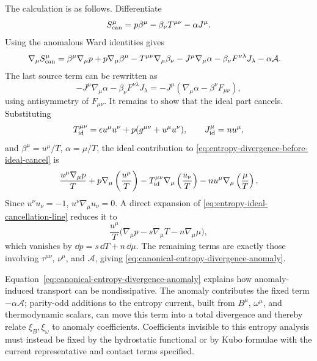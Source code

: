 The calculation is as follows.
Differentiate
\[
  S^\mu_{\rm can}=p\beta^\mu-\beta_\nu T^{\mu\nu}-\alpha J^\mu .
\]
Using the anomalous Ward identities gives
\begin{equation}
\begin{aligned}
  \nabla_\mu S^\mu_{\rm can}
  &=
  \beta^\mu\nabla_\mu p
  +p\nabla_\mu\beta^\mu
  -T^{\mu\nu}\nabla_\mu\beta_\nu
  -J^\mu\nabla_\mu\alpha
  -\beta_\nu F^{\nu\lambda}J_\lambda
  -\alpha\mathcal A .
\end{aligned}
  \label{eq:entropy-divergence-before-ideal-cancel}
\end{equation}
The last source term can be rewritten as
\begin{equation}
  -J^\mu\nabla_\mu\alpha-\beta_\nu F^{\nu\lambda}J_\lambda
  =
  -J^\mu\left(\nabla_\mu\alpha-\beta^\nu F_{\mu\nu}\right),
  \label{eq:entropy-force-combination}
\end{equation}
using antisymmetry of \(F_{\mu\nu}\).  It remains to show that the ideal
part cancels.  Substituting
\[
  T^{\mu\nu}_{\rm id}=\epsilon u^\mu u^\nu+p(g^{\mu\nu}+u^\mu u^\nu),
  \qquad J^\mu_{\rm id}=nu^\mu,
\]
and \(\beta^\mu=u^\mu/T\), \(\alpha=\mu/T\), the ideal contribution to
\eqref{eq:entropy-divergence-before-ideal-cancel} is
\begin{equation}
  \frac{u^\mu\nabla_\mu p}{T}
  +p\nabla_\mu\left(\frac{u^\mu}{T}\right)
  -T^{\mu\nu}_{\rm id}\nabla_\mu\left(\frac{u_\nu}{T}\right)
  -nu^\mu\nabla_\mu\left(\frac{\mu}{T}\right).
  \label{eq:entropy-ideal-cancellation-line}
\end{equation}
Since \(u^\nu u_\nu=-1\), \(u^\nu\nabla_\mu u_\nu=0\).  A direct expansion
of \eqref{eq:entropy-ideal-cancellation-line} reduces it to
\[
  \frac{u^\mu}{T}
  \bigl(\nabla_\mu p-s\nabla_\mu T-n\nabla_\mu\mu\bigr),
\]
which vanishes by \(\dd p=s\,\dd T+n\,\dd\mu\).  The remaining terms are
exactly those involving \(\tau^{\mu\nu}\), \(\nu^\mu\), and
\(\mathcal A\), giving
\eqref{eq:canonical-entropy-divergence-anomaly}.

Equation~\eqref{eq:canonical-entropy-divergence-anomaly} explains how
anomaly-induced transport can be nondissipative.  The anomaly contributes
the fixed term \(-\alpha\mathcal A\); parity-odd additions to the entropy
current, built from \(B^\mu\), \(\omega^\mu\), and thermodynamic scalars, can
move this term into a total divergence and thereby relate
\(\xi_B,\xi_\omega\) to anomaly coefficients.  Coefficients invisible to
this entropy analysis must instead be fixed by the hydrostatic functional or
by Kubo formulae with the current representative and contact terms specified.

